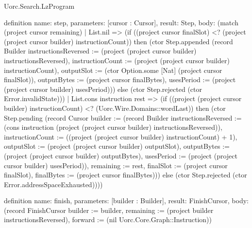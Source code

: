 \begin{lexlean}{Uorc.Search.LzProgram}
\begin{semanticmodule}
definition{
  name: step,
  parameters: [cursor : Cursor],
  result: Step,
  body: (match (project cursor remaining)
    | List.nil => (if ((project cursor finalSlot) <? (project (project cursor builder) instructionCount)) then (ctor Step.appended (record Builder {instructionsReversed := (project (project cursor builder) instructionsReversed), instructionCount := (project (project cursor builder) instructionCount), outputSlot := (ctor Option.some [Nat] (project cursor finalSlot)), outputBytes := (project cursor finalBytes), usesPeriod := (project (project cursor builder) usesPeriod)})) else (ctor Step.rejected (ctor Error.invalidState)))
    | List.cons instruction rest => (if ((project (project cursor builder) instructionCount) <? (Uorc.Wire.Domains::wordLast)) then (ctor Step.pending (record Cursor {builder := (record Builder {instructionsReversed := (cons instruction (project (project cursor builder) instructionsReversed)), instructionCount := ((project (project cursor builder) instructionCount) + 1), outputSlot := (project (project cursor builder) outputSlot), outputBytes := (project (project cursor builder) outputBytes), usesPeriod := (project (project cursor builder) usesPeriod)}), remaining := rest, finalSlot := (project cursor finalSlot), finalBytes := (project cursor finalBytes)})) else (ctor Step.rejected (ctor Error.addressSpaceExhausted))))
}

definition{
  name: finish,
  parameters: [builder : Builder],
  result: FinishCursor,
  body: (record FinishCursor {builder := builder, remaining := (project builder instructionsReversed), forward := (nil Uorc.Core.Graph::Instruction)})
}


\end{semanticmodule}
\end{lexlean}
